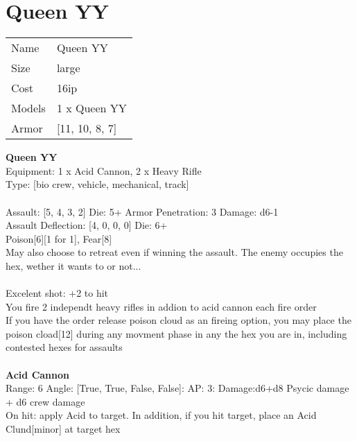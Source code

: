 \pagebreak\pagebreak

\section{ Queen YY }

\begin{tabular}{ll}
  Name & Queen YY \\
  Size & large\\
  Cost & 16ip\\
  Models & 1 x Queen YY\\
  Armor & [11, 10, 8, 7]\\
\end{tabular}

\noindent 

{\bf Queen YY } \\
Equipment: 1 x Acid Cannon, 2 x Heavy Rifle \\
Type: [bio crew, vehicle, mechanical, track] \\
\ \\
Assault: [5, 4, 3, 2] Die: 5+ Armor Penetration: 3 Damage: d6-1 \\
Assault Deflection: [4, 0, 0, 0] Die: 6+\\
\indent Poison[6][1 for 1], Fear[8]\\ 
May also choose to retreat even if winning the assault. The enemy occupies the hex, wether it wants to or not...\\ 
 
\ \\
Excelent shot: +2 to hit\\ 
You fire 2 independt heavy rifles in addion to acid cannon each fire order\\ 
If you have the order release poison cloud as an fireing option, you may place the poison cload[12] during any movment phase in any the hex you are in, including contested hexes for assaults\\ 

\ \\
{\bf Acid Cannon } \\



Range: 6  Angle: [True, True, False, False]: AP: 3: Damage:d6+d8 Psycic damage + d6 crew damage \\
On hit: apply Acid to target. In addition, if you hit target, place an Acid Clund[minor] at target hex\\ 




